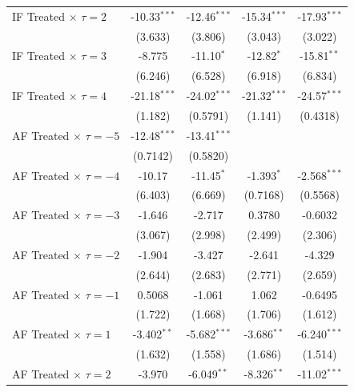 \begin{tabular}{lcccc}
   IF Treated $\times$ $\tau = 2$    & -10.33$^{***}$ & -12.46$^{***}$ & -15.34$^{***}$ & -17.93$^{***}$\\   
                                     & (3.633)        & (3.806)        & (3.043)        & (3.022)\\   
   IF Treated $\times$ $\tau = 3$    & -8.775         & -11.10$^{*}$   & -12.82$^{*}$   & -15.81$^{**}$\\   
                                     & (6.246)        & (6.528)        & (6.918)        & (6.834)\\   
   IF Treated $\times$ $\tau = 4$    & -21.18$^{***}$ & -24.02$^{***}$ & -21.32$^{***}$ & -24.57$^{***}$\\   
                                     & (1.182)        & (0.5791)       & (1.141)        & (0.4318)\\   
   AF Treated $\times$ $\tau = -5$   & -12.48$^{***}$ & -13.41$^{***}$ &                &   \\   
                                     & (0.7142)       & (0.5820)       &                &   \\   
   AF Treated $\times$ $\tau = -4$   & -10.17         & -11.45$^{*}$   & -1.393$^{*}$   & -2.568$^{***}$\\   
                                     & (6.403)        & (6.669)        & (0.7168)       & (0.5568)\\   
   AF Treated $\times$ $\tau = -3$   & -1.646         & -2.717         & 0.3780         & -0.6032\\   
                                     & (3.067)        & (2.998)        & (2.499)        & (2.306)\\   
   AF Treated $\times$ $\tau = -2$   & -1.904         & -3.427         & -2.641         & -4.329\\   
                                     & (2.644)        & (2.683)        & (2.771)        & (2.659)\\   
   AF Treated $\times$ $\tau = -1$   & 0.5068         & -1.061         & 1.062          & -0.6495\\   
                                     & (1.722)        & (1.668)        & (1.706)        & (1.612)\\   
   AF Treated $\times$ $\tau = 1$    & -3.402$^{**}$  & -5.682$^{***}$ & -3.686$^{**}$  & -6.240$^{***}$\\   
                                     & (1.632)        & (1.558)        & (1.686)        & (1.514)\\   
   AF Treated $\times$ $\tau = 2$    & -3.970         & -6.049$^{**}$  & -8.326$^{**}$  & -11.02$^{***}$\\   

\end{tabular}
